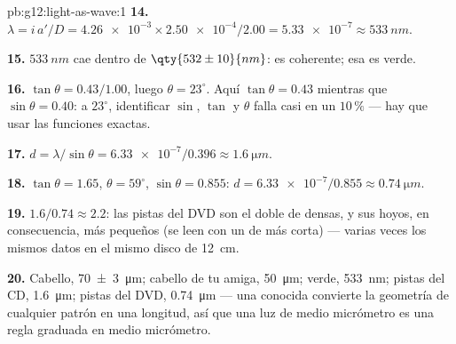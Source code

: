 \begin{solution}{pb:g12:light-as-wave:1}
\textbf{14.} $\lambda = i\,a'/D = \num{4.26e-3} \times
\num{2.50e-4}/2.00 = \num{5.33e-7} \approx \qty{533}{nm}$.

\textbf{15.} $\qty{533}{nm}$ cae dentro de $\qty{532 \pm 10}{nm}$: es
coherente; esa  es verde.

\textbf{16.} $\tan\theta = 0.43/1.00$, luego $\theta = 23^\circ$. Aquí
$\tan\theta = 0.43$ mientras que $\sin\theta = 0.40$: a $23^\circ$,
identificar $\sin$, $\tan$ y $\theta$ falla casi en un $10\,\%$ --- hay
que usar las funciones exactas.

\textbf{17.} $d = \lambda/\sin\theta = \num{6.33e-7}/0.396 \approx
\qty{1.6}{\micro m}$.

\textbf{18.} $\tan\theta = 1.65$, $\theta = 59^\circ$,
$\sin\theta = 0.855$: $d = \num{6.33e-7}/0.855 \approx
\qty{0.74}{\micro m}$.

\textbf{19.} $1.6/0.74 \approx 2.2$: las pistas del DVD son el doble de
densas, y sus hoyos, en consecuencia, más pequeños (se leen con un 
de  más corta) --- varias veces los mismos datos en el
mismo disco de \qty{12}{cm}.

\textbf{20.} Cabello, \qty{70 \pm 3}{\micro m}; cabello de tu amiga,
\qty{50}{\micro m};  verde, \qty{533}{nm}; pistas del CD,
\qty{1.6}{\micro m}; pistas del DVD, \qty{0.74}{\micro m} --- una
 conocida convierte la geometría de cualquier patrón en
una longitud, así que una luz de medio micrómetro es una regla graduada
en medio micrómetro.
\end{solution}
